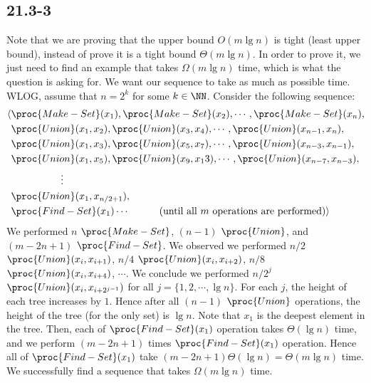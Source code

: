 \subsection*{21.3-3}

Note that we are proving that the upper bound $O(m \lg n)$ is tight (least upper bound),
instead of prove it is a tight bound $\Theta(m \lg n)$.
In order to prove it, we just need to find an example that takes $\Omega(m \lg n)$ time,
which is what the question is asking for.
We want our sequence to take as much as possible time.
WLOG, assume that $n = 2^k$ for some $k \in \NN$.
Consider the following sequence:
\begin{equation*}
\begin{split}
    \langle 
    & \proc{Make-Set}(x_1), \proc{Make-Set}(x_2), \cdots, \proc{Make-Set}(x_n), \\
    & \proc{Union}(x_1, x_2), \proc{Union}(x_3, x_4), \cdots, \proc{Union}(x_{n-1}, x_{n}), \\ 
    & \proc{Union}(x_1, x_3), \proc{Union}(x_5, x_7), \cdots, \proc{Union}(x_{n-3}, x_{n-1}), \\ 
    & \proc{Union}(x_1, x_5), \proc{Union}(x_9, x_13), \cdots, \proc{Union}(x_{n-7}, x_{n-3}), \\ 
    & \quad\quad\quad\quad\quad \vdots \\
    & \proc{Union}(x_1, x_{n / 2 + 1}), \\ 
    & \proc{Find-Set}(x_1) \cdots \quad\quad\quad \text{(until all $m$ operations are performed)} 
    \rangle
\end{split}
\end{equation*}
We performed $n$ $\proc{Make-Set}$, $(n-1)$ $\proc{Union}$, and $(m - 2n + 1)$ $\proc{Find-Set}$.
We observed we performed $n / 2$ $\proc{Union}(x_i, x_{i+1})$, $n / 4$ $\proc{Union}(x_i, x_{i+2})$,
$n / 8$ $\proc{Union}(x_i, x_{i+4})$, $\cdots$.
We conclude we performed $n / 2^j$ $\proc{Union}(x_i, x_{i+2^{j-1}})$ 
for all $j = \{ 1, 2, \cdots, \lg n \}$.
For each $j$, the height of each tree increases by $1$.
Hence after all $(n-1)$ $\proc{Union}$ operations,
the height of the tree (for the only set) is $\lg n$.
Note that $x_1$ is the deepest element in the tree.
Then, each of $\proc{Find-Set}(x_1)$ operation takes $\Theta(\lg n)$ time, 
and we perform $(m - 2n + 1)$ times $\proc{Find-Set}(x_1)$ operation.
Hence all of $\proc{Find-Set}(x_1)$ take $(m - 2n + 1)\Theta(\lg n) = \Theta(m \lg n)$ time.
We successfully find a sequence that takes $\Omega(m \lg n)$ time.

